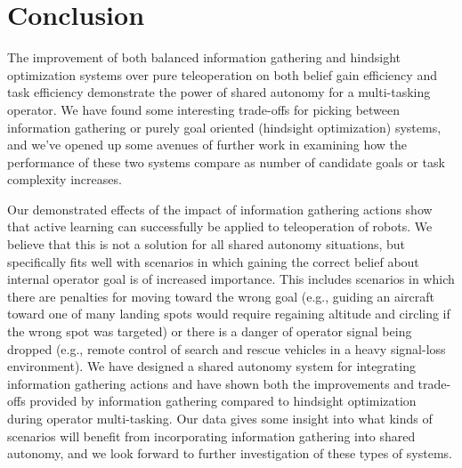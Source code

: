 \documentclass[conference]{IEEEtran}
\begin{document}
\section{Conclusion}

The improvement of both balanced information gathering and hindsight optimization systems over pure teleoperation on both belief gain efficiency and task efficiency demonstrate the power of shared autonomy for a multi-tasking operator. We have found some interesting trade-offs for picking between information gathering or purely goal oriented (hindsight optimization) systems, and we've opened up some avenues of further work in examining how the performance of these two systems compare as number of candidate goals or task complexity increases. 

Our demonstrated effects of the impact of information gathering actions show that active learning can successfully be applied to teleoperation of robots. We believe that this is not a solution for all shared autonomy situations, but specifically fits well with scenarios in which gaining the correct belief about internal operator goal is of increased importance. This includes scenarios in which there are penalties for moving toward the wrong goal (e.g., guiding an aircraft toward one of many landing spots would require regaining altitude and circling if the wrong spot was targeted) or there is a danger of operator signal being dropped (e.g., remote control of search and rescue vehicles in a heavy signal-loss environment). We have designed a shared autonomy system for integrating information gathering actions and have shown both the improvements and trade-offs provided by information gathering compared to hindsight optimization during operator multi-tasking. Our data gives some insight into what kinds of scenarios will benefit from incorporating information gathering into shared autonomy, and we look forward to further investigation of these types of systems.  



\end{document}
